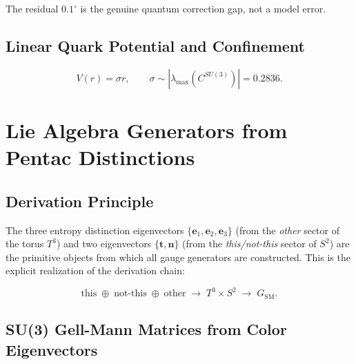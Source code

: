 \documentclass[11pt]{article}
\begin{document}
The residual $0.1^\circ$ is the genuine quantum correction gap,
not a model error.

\subsection{Linear Quark Potential and Confinement}

\begin{equation}
  V(r) = \sigma r,
  \qquad
  \sigma \sim |\lambda_\text{max}(C^{SU(3)})| = 0.2836.
\end{equation}

\section{Lie Algebra Generators from Pentac Distinctions}
\label{sec:generators}

\subsection{Derivation Principle}

The three entropy distinction eigenvectors
$\{\mathbf{e}_1,\mathbf{e}_2,\mathbf{e}_3\}$ (from the
\emph{other} sector of the torus $T^3$) and two
eigenvectors $\{\mathbf{t},\mathbf{n}\}$ (from the
\emph{this/not-this} sector of $S^2$) are the primitive
objects from which all gauge generators are constructed.
This is the explicit realization of the derivation chain:

\begin{equation}
  \text{this} \;\oplus\; \text{not-this} \;\oplus\; \text{other}
  \;\longrightarrow\;
  T^3\times S^2
  \;\longrightarrow\;
  G_{\mathrm{SM}}.
\end{equation}

\subsection{SU(3) Gell-Mann Matrices from Color Eigenvectors}
\end{document}
